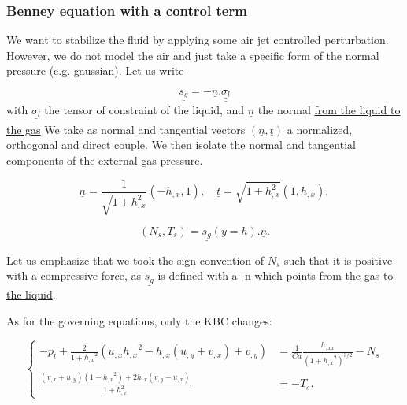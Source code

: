 \documentclass[12pt]{article}
\begin{document}
\subsubsection{Benney equation with a control term}
We want to stabilize the fluid by applying some air jet controlled perturbation. However, we do not model the air and just take a specific form of the normal pressure (e.g. gaussian). Let us write 

\begin{equation}
    \underline{s_g}= -\underline{n}.\underline{\underline{\sigma_l}}
\end{equation}
with $\underline{\underline{\sigma_l}}$ the tensor of constraint of the liquid, and $\underline{n}$ the normal \underline{from the liquid to the gas} We take as normal and tangential vectors $(\underline{n}, \underline{t})$ a normalized, orthogonal and direct couple. We then isolate the normal and tangential components of the external gas pressure. 

 \begin{equation}
     \underline{n}=\frac{1}{\sqrt{1+h_{,x}^2}}(-h_{,x}, 1), \quad \underline{t} = \sqrt{1+h_{,x}^2}(1, h_{,x}),
 \end{equation}

\begin{equation}
    \boxed{
    (N_s, T_s) =  \underline{s_g}(y=h).\underline{n}.
    }
\end{equation}

Let us emphasize that we took the sign convention of $N_s$ such that it is positive with a compressive force, as $\underline{s_g}$ is defined with a -\underline{n} which points \underline{from the gas to the liquid}. 

As for the governing equations, only the KBC changes: 

\begin{equation}\label{eq DBC_Control}
    \left\{
    \begin{aligned}
    -p_l + \frac{2}{1+{h_{,x}}^2}(u_{,x}{h_{,x}}^2 - h_{,x}(u_{,y} + v_{,x})+v_{,y}) &= \frac{1}{Ca} \frac{h_{,xx}}{(1+{h_{,x}}^2)^{3/2}}-N_s \\
    \frac{(v_{,x} + u_{,y})(1-{h_{,x}}^2)+2h_{,x}(v_{,y}-u_{,x})}{1+h_{,x}^2} &= -T_s.
    \end{aligned}
    \right.
\end{equation}
\end{document}
